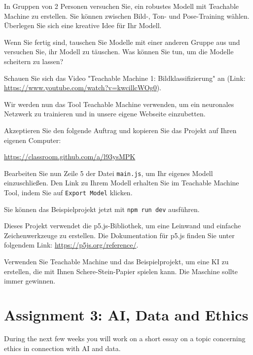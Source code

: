\documentclass[12pt,a4paper]{report}
\begin{document}
\begin{ex}
    In Gruppen von 2 Personen versuchen Sie, ein robustes Modell mit Teachable Machine zu erstellen. Sie können zwischen Bild-, Ton- und Pose-Training wählen. Überlegen Sie sich eine kreative Idee für Ihr Modell.

    Wenn Sie fertig sind, tauschen Sie Modelle mit einer anderen Gruppe aus und versuchen Sie, ihr Modell zu täuschen. Was können Sie tun, um die Modelle scheitern zu lassen?
\end{ex}

\begin{ex}
    Schauen Sie sich das Video "Teachable Machine 1: Bildklassifizierung" an (Link: \url{https://www.youtube.com/watch?v=kwcillcWOg0}).
\end{ex}

Wir werden nun das Tool Teachable Machine verwenden, um ein neuronales Netzwerk zu trainieren und in unsere eigene Webseite einzubetten.

\begin{ex}
    Akzeptieren Sie den folgende Auftrag und kopieren Sie das Projekt auf Ihren eigenen Computer:

    \url{https://classroom.github.com/a/l93ysMPK}

    Bearbeiten Sie nun Zeile 5 der Datei \verb|main.js|, um Ihr eigenes Modell einzuschließen. Den Link zu Ihrem Modell erhalten Sie im Teachable Machine Tool, indem Sie auf \verb|Export Model| klicken.

    Sie können das Beispielprojekt jetzt mit \verb|npm run dev| ausführen.

    Dieses Projekt verwendet die p5.js-Bibliothek, um eine Leinwand und einfache Zeichenwerkzeuge zu erstellen. Die Dokumentation für p5.js finden Sie unter folgendem Link: \url{https://p5js.org/reference/}.
\end{ex}

\begin{ex}
    Verwenden Sie Teachable Machine und das Beispielprojekt, um eine KI zu erstellen, die mit Ihnen Schere-Stein-Papier spielen kann. Die Maschine sollte immer gewinnen.
\end{ex}

\newpage

\section*{Assignment 3: AI, Data and Ethics}
During the next few weeks you will work on a short essay on a topic concerning ethics in connection with AI and data. 
\end{document}
